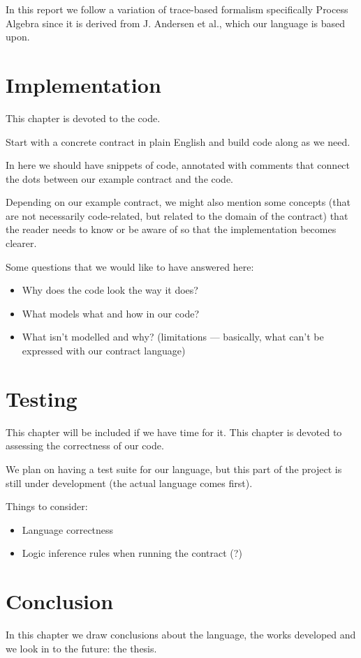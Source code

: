\documentclass{ituthesis}
\begin{document}
In this report we follow a variation of trace-based formalism specifically Process Algebra since it is derived from J. Andersen et al., which our language is based upon.


\chapter{Implementation}
This chapter is devoted to the code.\par
Start with a concrete contract in plain English and build code along as we need.\par
In here we should have snippets of code, annotated with comments that connect the dots between our example contract and the code.\par
Depending on our example contract, we might also mention some concepts (that are not necessarily code-related, but related to the domain of the contract) that the reader needs to know or be aware of so that the implementation becomes clearer.\par
Some questions that we would like to have answered here:
\begin{itemize}
    \item Why does the code look the way it does?
    \item What models what and how in our code?
    \item What isn't modelled and why? (limitations --- basically, what can't be expressed with our contract language)
\end{itemize}


\chapter{Testing}
This chapter will be included if we have time for it.
This chapter is devoted to assessing the correctness of our code.\par
We plan on having a test suite for our language, but this part of the project is still under development (the actual language comes first).\par
Things to consider:
\begin{itemize}
    \item Language correctness
    \item Logic inference rules when running the contract (?)
\end{itemize}


\chapter{Conclusion}
In this chapter we draw conclusions about the language, the works developed and we look in to the future: the thesis.





\printbibliography
\end{document}
